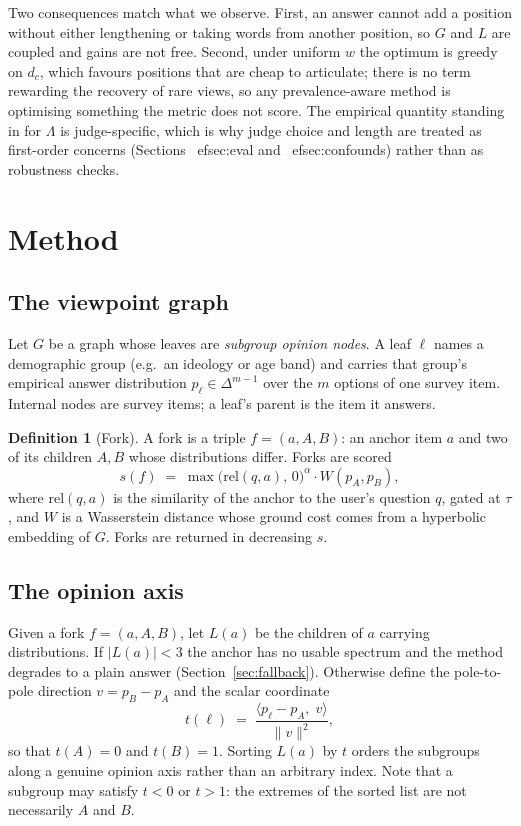 \documentclass[11pt]{article}
\theoremstyle{definition}
\newtheorem{definition}{Definition}
\begin{document}
Two consequences match what we observe. First, an answer cannot add a position
without either lengthening or taking words from another position, so $G$ and $L$
are coupled and gains are not free. Second, under uniform $w$ the optimum is
greedy on $d_c$, which favours positions that are cheap to articulate; there is
no term rewarding the recovery of rare views, so any prevalence-aware method is
optimising something the metric does not score. The empirical quantity standing
in for $\Lambda$ is judge-specific, which is why judge choice and length
are treated as first-order concerns (Sections~
ef{sec:eval}
and~
ef{sec:confounds}) rather than as robustness checks.

\section{Method}

\subsection{The viewpoint graph}

Let $G$ be a graph whose leaves are \emph{subgroup opinion nodes}. A leaf
$\ell$ names a demographic group (e.g.\ an ideology or age band) and carries
that group's empirical answer distribution $p_\ell \in \Delta^{m-1}$ over the
$m$ options of one survey item. Internal nodes are survey items; a leaf's parent
is the item it answers.

\begin{definition}[Fork]
A fork is a triple $f = (a, A, B)$: an anchor item $a$ and two of its children
$A, B$ whose distributions differ. Forks are scored
\[
  s(f) \;=\; \max\bigl(\mathrm{rel}(q, a),\, 0\bigr)^{\alpha} \cdot W(p_A, p_B),
\]
where $\mathrm{rel}(q,a)$ is the similarity of the anchor to the user's question
$q$, gated at $\tau$, and $W$ is a Wasserstein distance whose ground cost comes
from a hyperbolic embedding of $G$. Forks are returned in decreasing $s$.
\end{definition}

\subsection{The opinion axis}

Given a fork $f = (a, A, B)$, let $L(a)$ be the children of $a$ carrying
distributions. If $|L(a)| < 3$ the anchor has no usable spectrum and the method
degrades to a plain answer (Section~\ref{sec:fallback}). Otherwise define the
pole-to-pole direction $v = p_B - p_A$ and the scalar coordinate
\[
  t(\ell) \;=\; \frac{\langle p_\ell - p_A,\; v\rangle}{\lVert v \rVert^2},
\]
so that $t(A) = 0$ and $t(B) = 1$. Sorting $L(a)$ by $t$ orders the subgroups
along a genuine opinion axis rather than an arbitrary index. Note that a
subgroup may satisfy $t < 0$ or $t > 1$: the extremes of the sorted list are not
necessarily $A$ and $B$.
\end{document}
